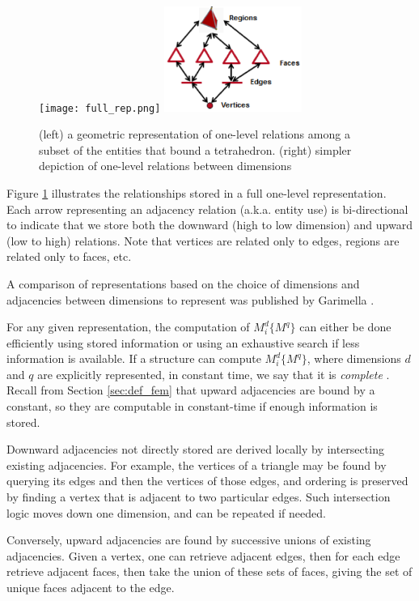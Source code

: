\begin{figure}
\begin{center}
\texttt{[image: full\_rep.png]}
\includegraphics[width=0.4\textwidth]{one_level.png}
\caption{(left) a geometric representation of one-level
relations among a subset of the entities that bound a tetrahedron.
(right) simpler depiction of one-level relations between dimensions}
\label{fig:topo}
\end{center}
\end{figure}

Figure \ref{fig:topo} illustrates the relationships
stored in a full one-level representation.
Each arrow representing an adjacency relation (a.k.a. entity use)
is bi-directional to indicate that we store both the
downward (high to low dimension) and upward (low to high) relations.
Note that vertices are related only to edges,
regions are related only to faces, etc.

A comparison of representations based on the choice
of dimensions and adjacencies between
dimensions to represent
was published by Garimella \cite{garimella2002mesh}.

For any given representation, the computation of $M^d_i\{M^q\}$
can either be done efficiently using stored information
or using an exhaustive search if less information is available.
If a structure can compute $M^d_i\{M^q\}$, where dimensions
$d$ and $q$ are explicitly represented, in constant time,
we say that it is {\it complete} \cite{seol2006efficient}.
Recall from Section \ref{sec:def_fem} that upward adjacencies
are bound by a constant, so they are computable in
constant-time if enough information is stored.

Downward adjacencies not directly stored are derived
locally by intersecting existing adjacencies.
For example, the vertices of a triangle may be found
by querying its edges and then the vertices of those
edges, and ordering is preserved by finding a vertex
that is adjacent to two particular edges.
Such intersection logic moves down one dimension, and
can be repeated if needed.

Conversely, upward adjacencies are found by successive
unions of existing adjacencies.
Given a vertex, one can retrieve adjacent edges, then
for each edge retrieve adjacent faces, then take the
union of these sets of faces, giving the set of unique
faces adjacent to the edge.

